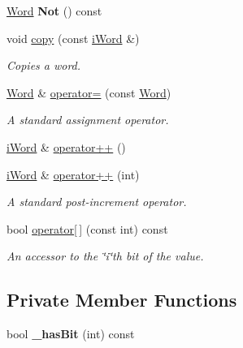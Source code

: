 \begin{DoxyCompactItemize}
\item 
\hypertarget{classWord_afdecfa9e3f2fda36496f249617a4cef5}{
\hyperlink{classWord}{Word} {\bfseries Not} () const }
\label{classWord_afdecfa9e3f2fda36496f249617a4cef5}

\item 
void \hyperlink{classWord_abb97142e332c7cc25d2a0c2bdb6c3d9b}{copy} (const \hyperlink{classiWord}{iWord} \&)
\begin{DoxyCompactList}\small\item\em Copies a word. \item\end{DoxyCompactList}\item 
\hyperlink{classWord}{Word} \& \hyperlink{classWord_a2ae41869cb0f1855fc18c6bce05f7c4d}{operator=} (const \hyperlink{classWord}{Word})
\begin{DoxyCompactList}\small\item\em A standard assignment operator. \item\end{DoxyCompactList}\item 
\hyperlink{classiWord}{iWord} \& \hyperlink{classWord_a3837f49bcb44597e6d738ccb0eeed144}{operator++} ()
\item 
\hyperlink{classiWord}{iWord} \& \hyperlink{classWord_ae921b75d263be790fd150c5962445163}{operator++} (int)
\begin{DoxyCompactList}\small\item\em A standard post-\/increment operator. \item\end{DoxyCompactList}\item 
bool \hyperlink{classWord_ab0f10ac1a0397559b859774b503538fe}{operator\mbox{[}$\,$\mbox{]}} (const int) const 
\begin{DoxyCompactList}\small\item\em An accessor to the \char`\"{}i\char`\"{}th bit of the value. \item\end{DoxyCompactList}\end{DoxyCompactItemize}
\subsection*{Private Member Functions}
\begin{DoxyCompactItemize}
\item 
\hypertarget{classWord_aaacae836ba9ed28f9725432ae81ab318}{
bool {\bfseries \_\-hasBit} (int) const }
\label{classWord_aaacae836ba9ed28f9725432ae81ab318}

\end{DoxyCompactItemize}
